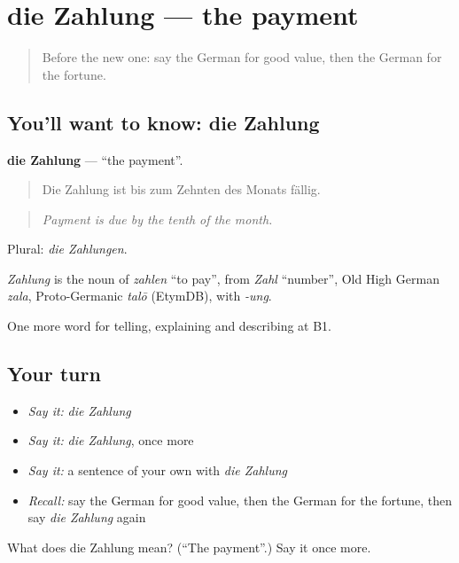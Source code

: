 \section[die Zahlung]{die Zahlung — the payment}

\label{lesson:GE-C390-zahlung}



\begin{quote}
Before the new one: say the German for good value, then the German for the fortune.
\end{quote}

\subsection*{You'll want to know: die Zahlung}
\textbf{die Zahlung} — \textquotedblleft{}the payment\textquotedblright{}.

\begin{quote}
Die Zahlung ist bis zum Zehnten des Monats fällig.
\end{quote}

\begin{quote}
\emph{Payment is due by the tenth of the month.}
\end{quote}

Plural: \emph{die Zahlungen}.

\begin{cousinweb}
\emph{Zahlung} is the noun of \emph{zahlen} \textquotedblleft{}to pay\textquotedblright{}, from \emph{Zahl} \textquotedblleft{}number\textquotedblright{}, Old High German \emph{zala}, Proto-Germanic \emph{talō} (EtymDB), with \emph{-ung}.
\end{cousinweb}

\begin{grammarlens}[title={What you've built}]
One more word for telling, explaining and describing at B1.
\end{grammarlens}

\subsection*{Your turn}
\begin{itemize}
\raggedright
  \item \emph{Say it:} \emph{die Zahlung}
  \item \emph{Say it:} \emph{die Zahlung}, once more
  \item \emph{Say it:} a sentence of your own with \emph{die Zahlung}
  \item \emph{Recall:} say the German for good value, then the German for the fortune, then say \emph{die Zahlung} again
\end{itemize}

\begin{tcolorbox}[breakable,colback=teal!4,colframe=teal!35!black,title={Before you move on}]
What does die Zahlung mean? (\textquotedblleft{}The payment\textquotedblright{}.) Say it once more.
\end{tcolorbox}
